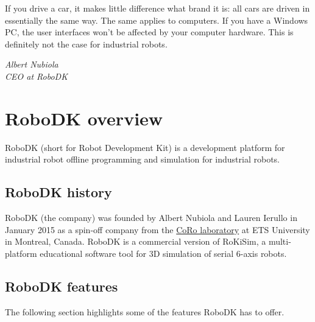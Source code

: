 \epigraph{If you drive a car, it makes little difference what brand it is: all cars are driven
in essentially the same way. The same applies to computers. If you have a
Windows PC, the user interfaces won’t be affected by your computer hardware.
This is definitely not the case for industrial robots.}{\textit{Albert Nubiola \\ CEO at RoboDK}}

\section{RoboDK overview}

RoboDK (short for Robot Development Kit) is a development platform for industrial robot offline programming and simulation for industrial robots.

\subsection{RoboDK history}

RoboDK (the company) was founded by Albert Nubiola and Lauren Ierullo in January 2015 as a spin-off company from the \href{https://en.etsmtl.ca/unites-de-recherche/coro/accueil?lang=en-CA}{CoRo laboratory}   at ETS University in Montreal, Canada. RoboDK is a commercial version of RoKiSim, a multi-platform educational software tool for 3D simulation of serial 6-axis robots.

\subsection{RoboDK features}


The following section highlights some of the features RoboDK has to offer. 


